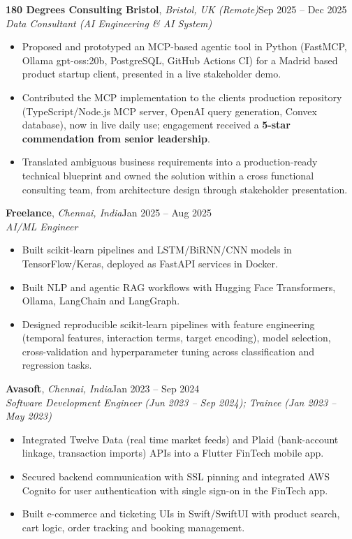 \documentclass[a4paper,11pt]{article}
\newcommand{\entry}[3]{\needspace{4\baselineskip}\noindent #1\hfill #2\\ #3\par}
\begin{document}
\entry{\textbf{180 Degrees Consulting Bristol}, \textit{Bristol, UK (Remote)}}{Sep 2025 – Dec 2025}{\textit{Data Consultant (AI Engineering \& AI System)}}
\begin{itemize}
    \item Proposed and prototyped an MCP-based agentic tool in Python (FastMCP, Ollama gpt-oss:20b, PostgreSQL, GitHub Actions CI) for a Madrid based product startup client, presented in a live stakeholder demo.
    \item Contributed the MCP implementation to the client\textquotesingle{}s production repository (TypeScript/Node.js MCP server, OpenAI query generation, Convex database), now in live daily use; engagement received a \textbf{5-star commendation from senior leadership}.
    \item Translated ambiguous business requirements into a production-ready technical blueprint and owned the solution within a cross functional consulting team, from architecture design through stakeholder presentation.
\end{itemize}

\vspace{6pt}

\entry{\textbf{Freelance}, \textit{Chennai, India}}{Jan 2025 – Aug 2025}{\textit{AI/ML Engineer}}
\begin{itemize}
    \item Built scikit-learn pipelines and LSTM/BiRNN/CNN models in TensorFlow/Keras, deployed as FastAPI services in Docker.
    \item Built NLP and agentic RAG workflows with Hugging Face Transformers, Ollama, LangChain and LangGraph.
    \item Designed reproducible scikit-learn pipelines with feature engineering (temporal features, interaction terms, target encoding), model selection, cross-validation and hyperparameter tuning across classification and regression tasks.
\end{itemize}

\vspace{6pt}

\entry{\textbf{Avasoft}, \textit{Chennai, India}}{Jan 2023 – Sep 2024}{\textit{Software Development Engineer (Jun 2023 – Sep 2024); Trainee (Jan 2023 – May 2023)}}
\begin{itemize}
    \item Integrated Twelve Data (real time market feeds) and Plaid (bank-account linkage, transaction imports) APIs into a Flutter FinTech mobile app.
    \item Secured backend communication with SSL pinning and integrated AWS Cognito for user authentication with single sign-on in the FinTech app.
    \item Built e-commerce and ticketing UIs in Swift/SwiftUI with product search, cart logic, order tracking and booking management.
\end{itemize}
\end{document}
